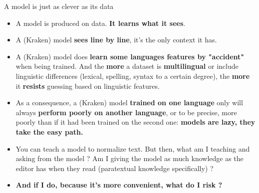 \documentclass[aspectratio=169]{beamer}
\begin{document}
\begin{frame}{A model is just as clever as its data}
    \begin{itemize}
        \item A model is produced on data. \textbf{It learns what it sees}.
        \item A (Kraken) model \textbf{sees line by line}, it's the only context it has.
        \item A (Kraken) model does \textbf{learn some languages features by "accident"} when being trained. And the \textbf{more} a dataset is \textbf{multilingual} or include linguistic differences (lexical, spelling, syntax to a certain degree), the \textbf{more} it \textbf{resists} guessing based on linguistic features.
        \item As a consequence, a (Kraken) model \textbf{trained on one language} only will always \textbf{perform poorly on another language}, or to be precise, more poorly than if it had been trained on the second one: \textbf{models are lazy, they take the easy path.}
        \item You can teach a model to normalize text. But then, what am I teaching and asking from the model ? Am I giving the model as much knowledge as the editor has when they read (paratextual knowledge specifically) ?
        \item<2> \textbf{And if I do, because it's more convenient, what do I risk ?}
    \end{itemize}
\end{frame}
\end{document}
